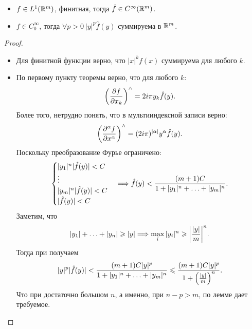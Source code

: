 \begin{corollary}
    \enewline
    \begin{itemize}
        \item $f \in L^1(\Rm)$, финитная, тогда $\hat{f} \in C^\infty(\Rm)$.
        \item $f \in C_0^\infty$, тогда $\forall p > 0~ |y|^p \hat{f}(y)$
            суммируема в $\Rm$.
    \end{itemize}
\end{corollary}
\begin{proof}
    \enewline
    \begin{itemize}
        \item Для финитной функции верно, что $|x|^k f(x)$ суммируема для любого $k$.
        \item По первому пункту теоремы верно, что для любого $k$:
            \[
                \parens*{\pderv{f}{x_k}}^\wedge = 2i\pi y_k \hat{f}(y)
            .\]
            Более того, нетрудно понять, что в мультииндексной записи верно:
            \[
                \parens*{\hderv{\a}{f}{x^\a}}^\wedge = (2i\pi)^{|\a|} y^\a
                \hat{f}(y)
            .\]
            Поскольку преобразование Фурье ограничено:
            \[
                \begin{cases}
                    |y_1|^n |\hat{f}(y)| < C \\
                    \vdots \\
                    |y_m|^n |\hat{f}(y)| < C \\
                    |\hat{f}(y)| < C
                \end{cases} \Lra \hat{f}(y) < \frac{(m + 1) C}{1 + |y_1|^n +
                \ldots + |y_m|^n}
            .\]
            Заметим, что
            \[
                |y_1| + \ldots + |y_n| \geqslant |y| \Lra \max_{i}{|y_i|^n}
                \geqslant \abs*{\frac{|y|}{m}}^n
            .\]
            Тогда при получаем
            \[
                |y|^p |\hat{f}(y)| < \frac{(m + 1) C |y|^p}{1 + |y_1|^n +
                \ldots + |y_m|^n} \leqslant \frac{(m + 1) C |y|^p}{1 + \parens*{
                \frac{|y|}{m}}^n}
            .\]
            Что при достаточно большом $n$, а именно, при $n - p > m$, по лемме
            дает требуемое.
    \end{itemize}
\end{proof}

